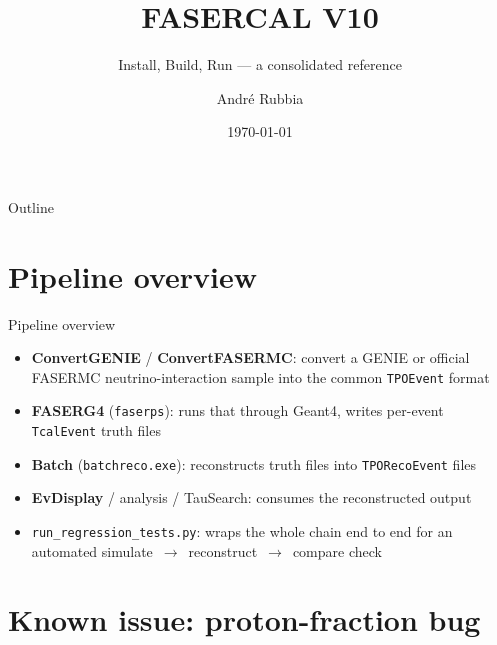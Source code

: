 \documentclass[aspectratio=169]{beamer}
\title{FASERCAL V10}
\subtitle{Install, Build, Run --- a consolidated reference}
\author{Andr\'e Rubbia}
\institute{IPA Rubbia Group, ETH Z\"urich}
\date{\today}
\begin{document}
\begin{frame}
  \titlepage
\end{frame}

\begin{frame}{Outline}
  \tableofcontents
\end{frame}

\section{Pipeline overview}

\begin{frame}{Pipeline overview}
  \begin{itemize}
    \item \textbf{ConvertGENIE} / \textbf{ConvertFASERMC}: convert a GENIE or
      official FASERMC neutrino-interaction sample into the common
      \texttt{TPOEvent} format
    \item \textbf{FASERG4} (\texttt{faserps}): runs that through Geant4,
      writes per-event \texttt{TcalEvent} truth files
    \item \textbf{Batch} (\texttt{batchreco.exe}): reconstructs truth files
      into \texttt{TPORecoEvent} files
    \item \textbf{EvDisplay} / analysis / TauSearch: consumes the
      reconstructed output
    \item \texttt{run\_regression\_tests.py}: wraps the whole chain end to
      end for an automated simulate~$\to$~reconstruct~$\to$~compare check
  \end{itemize}
\end{frame}

\section{Known issue: proton-fraction bug}
\end{document}
